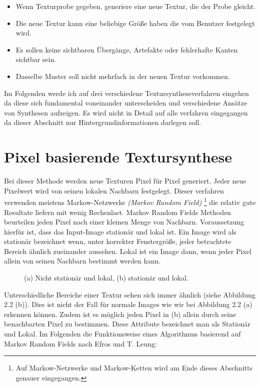 \documentclass[12pt, a4paper,twoside,openright]{report}
\begin{document}
\begin{itemize}
    \item Wenn Texturprobe gegeben, generiere eine neue Textur, die der Probe gleicht.
    \item Die neue Textur kann eine beliebige Größe haben die vom Benutzer festgelegt wird.
    \item Es sollen keine sichtbaren Übergänge, Artefakte oder fehlerhafte Kanten sichtbar sein.
    \item Dasselbe Muster soll nicht mehrfach in der neuen Textur vorkommen. \cite[S.2]{GomathiShah2009}
\end{itemize}

Im Folgenden werde ich auf drei verschiedene Textursyntheseverfahren eingehen da diese sich fundamental voneinander unterscheiden und verschiedene Ansätze von Synthesen aufzeigen.
Es wird nicht in Detail auf alle verfahren eingegangen da dieser Abschnitt nur Hintergrundinformationen darlegen soll.

\section{Pixel basierende Textursynthese}

Bei dieser Methode werden neue Texturen Pixel für Pixel generiert.
Jeder neue Pixelwert wird von seinen lokalen Nachbarn festgelegt.
Dieser verfahren verwenden meistens Markow-Netzwerke \textit{(Markov Random Field)}
\footnote[1]{Auf Markow-Netzwerke und Markow-Ketten wird am Ende dieses Abschnitts genauer eingegangen.}
die relativ gute Resultate liefern mit wenig Rechenlast.
Markov Random Fields Methoden beurteilen jeden Pixel nach einer kleinen Menge von Nachbarn.
Voraussetzung hierfür ist, dass das Input-Image stationär und lokal ist.
Ein Image wird als stationär bezeichnet wenn, unter korrekter Fenstergröße,
jeder betrachtete Bereich ähnlich zueinander aussehen.
Lokal ist ein Image dann, wenn jeder Pixel allein von seinen Nachbarn bestimmt werden kann. \cite{GomathiShah2009}

\begin{figure}[H]
    \centering
    \qquad
    \caption{(a) Nicht stationär und lokal, (b) stationär und lokal.}%
\end{figure}

Unterschiedliche Bereiche einer Textur sehen sich immer ähnlich {(siehe Abbildung 2.2 (b))}.
Dies ist nicht der Fall für normale Images wie wir bei Abbildung 2.2 {(a)} erkennen können.
Zudem ist es möglich jeden Pixel in {(b)} allein durch seine benachbarten Pixel zu bestimmen.
Diese Attribute bezeichnet man als Stationär und Lokal. \cite{GomathiShah2009}
Im Folgenden die Funktionsweise eines Algorithmus basierend auf Markov Random Fields nach Efros und T. Leung: \cite{Efros99}
\end{document}
